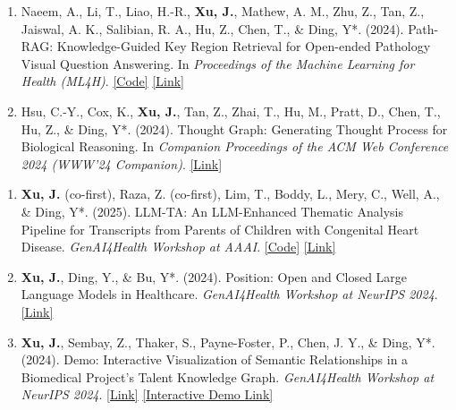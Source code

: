 \documentclass[a4paper,9pt]{extarticle}
\begin{document}
\begin{enumerate}[resume,leftmargin=0.8cm]
    \item Naeem, A., Li, T., Liao, H.-R., \textbf{Xu, J.}, Mathew, A. M., Zhu, Z., Tan, Z., Jaiswal, A. K., Salibian, R. A., Hu, Z., Chen, T., \& Ding, Y*. (2024). Path-RAG: Knowledge-Guided Key Region Retrieval for Open-ended Pathology Visual Question Answering. In \textit{Proceedings of the Machine Learning for Health (ML4H)}. \href{https://github.com/embedded-robotics/path-rag}{[Code]} \href{https://arxiv.org/abs/2411.17073}{[Link]}
    \vspace{.2cm}
    \item Hsu, C.-Y., Cox, K., \textbf{Xu, J.}, Tan, Z., Zhai, T., Hu, M., Pratt, D., Chen, T., Hu, Z., \& Ding, Y*. (2024). Thought Graph: Generating Thought Process for Biological Reasoning. In \textit{Companion Proceedings of the ACM Web Conference 2024 (WWW’24 Companion)}. \href{https://doi.org/10.1145/3589335.3651572}{[Link]}
    \vspace{.2cm}

\end{enumerate}

\vspace{0.2cm}
\begin{enumerate}[resume,leftmargin=0.8cm]
    \item \textbf{Xu, J.} (co-first), Raza, Z. (co-first), Lim, T., Boddy, L., Mery, C., Well, A., \& Ding, Y*. (2025). LLM-TA: An LLM-Enhanced Thematic Analysis Pipeline for Transcripts from Parents of Children with Congenital Heart Disease. \textit{GenAI4Health Workshop at AAAI}. \href{https://github.com/jiaweixu98/LLM-TA}{[Code]} \href{https://arxiv.org/abs/2502.01620}{[Link]}
    \vspace{.2cm}
    \item \textbf{Xu, J.}, Ding, Y., \& Bu, Y*. (2024). Position: Open and Closed Large Language Models in Healthcare. \textit{GenAI4Health Workshop at NeurIPS 2024}. \href{https://openreview.net/pdf?id=wFnzrOXxiB}{[Link]}
    \vspace{.2cm}
    \item \textbf{Xu, J.}, Sembay, Z., Thaker, S., Payne-Foster, P., Chen, J. Y., \& Ding, Y*. (2024). Demo: Interactive Visualization of Semantic Relationships in a Biomedical Project’s Talent Knowledge Graph. \textit{GenAI4Health Workshop at NeurIPS 2024}. \href{https://openreview.net/pdf?id=l0hhJip6fC}{[Link]} \href{https://cm4aikg.vercel.app/}{[Interactive Demo Link]}
\end{enumerate}
\end{document}
